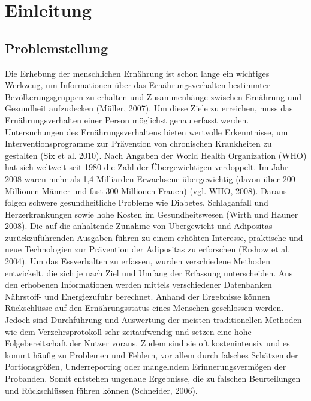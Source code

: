 
\section{Einleitung}

\subsection{Problemstellung}
Die Erhebung der menschlichen  Ernährung ist schon lange ein wichtiges Werkzeug, um Informationen über das Ernährungsverhalten bestimmter Bevölkerungsgruppen zu erhalten und Zusammenhänge zwischen Ernährung und Gesundheit aufzudecken (Müller, 2007).
Um diese Ziele zu erreichen, muss das Ernährungsverhalten einer Person möglichst genau erfasst werden. Untersuchungen des Ernährungsverhaltens bieten wertvolle Erkenntnisse, um Interventionsprogramme zur Prävention von chronischen Krankheiten zu gestalten (Six et al. 2010). Nach  Angaben der World Health Organization (WHO) hat sich weltweit seit 1980 die Zahl der Übergewichtigen verdoppelt. Im Jahr 2008 waren mehr als 1,4 Milliarden Erwachsene übergewichtig (davon über 200 Millionen Männer und fast 300 Millionen Frauen) (vgl. WHO, 2008). Daraus folgen schwere gesundheitliche Probleme wie Diabetes, Schlaganfall und Herzerkrankungen sowie hohe Kosten im Gesundheitswesen (Wirth und Hauner 2008). Die auf die anhaltende Zunahme von Übergewicht und Adipositas zurückzuführenden Ausgaben führen zu einem erhöhten Interesse, praktische und neue Technologien zur Prävention der Adipositas zu erforschen (Ershow et al. 2004). Um das Essverhalten zu erfassen, wurden verschiedene Methoden entwickelt, die sich je nach Ziel und Umfang der Erfassung unterscheiden. Aus den erhobenen Informationen werden mittels verschiedener Datenbanken Nährstoff- und Energiezufuhr berechnet. Anhand der Ergebnisse können Rückschlüsse auf den Ernährungsstatus eines Menschen geschlossen werden. Jedoch sind Durchführung und Auswertung der meisten traditionellen Methoden wie dem Verzehrsprotokoll sehr zeitaufwendig und setzen eine hohe Folgebereitschaft der Nutzer voraus. Zudem sind sie oft kostenintensiv und es kommt häufig zu Problemen und Fehlern, vor allem durch falsches Schätzen der Portionsgrößen, Underreporting oder mangelndem Erinnerungsvermögen der Probanden. Somit entstehen ungenaue Ergebnisse, die zu falschen Beurteilungen und Rückschlüssen führen können (Schneider, 2006).



